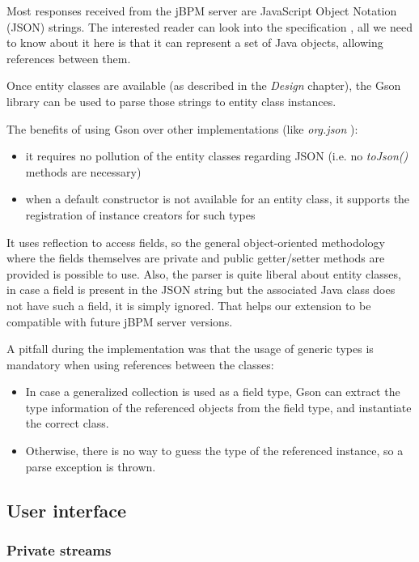 Most responses received from the jBPM server are JavaScript Object Notation
(JSON) strings. The interested reader can look into the
specification \cite{json}, all we need to know about it here is that it can
represent a set of Java objects, allowing references between them.

Once entity classes are available (as described in the \emph{Design} chapter),
the Gson library \cite{gson} can be used to parse those strings to entity class
instances.

The benefits of using Gson over other implementations (like
\emph{org.json} \cite{org-json}):

\begin{itemize}
\item it requires no pollution of the entity classes regarding JSON (i.e. no \emph{toJson()} methods are necessary)
\item when a default constructor is not available for an entity class, it supports the registration of instance creators for such types
\end{itemize}

It uses reflection to access fields, so the general object-oriented methodology
where the fields themselves are private and public getter/setter methods are
provided is possible to use. Also, the parser is quite liberal about entity
classes, in case a field is present in the JSON string but the associated Java
class does not have such a field, it is simply ignored. That helps our
extension to be compatible with future jBPM server versions.

A pitfall during the implementation was that the usage of generic types is
mandatory when using references between the classes:

\begin{itemize}
\item In case a generalized collection is used as a field type, Gson can extract the type information of the referenced objects from the field type, and instantiate the correct class.
\item Otherwise, there is no way to guess the type of the referenced instance, so a parse exception is thrown.
\end{itemize}

\subsection{User interface}

\subsubsection*{Private streams}

